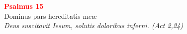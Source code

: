 


\def\greinitialformat#1{%
{\fontsize{39}{39}\selectfont #1}%
}




\vspace{0.3cm}
\begin{center}
 \textcolor{red}{\large \bf Psalmus 15}\\
Dominus pars hereditatis meæ\\
\textit{\small Deus suscitavit Iesum, solutis doloribus inferni. (Act 2,24)}
\end{center}
